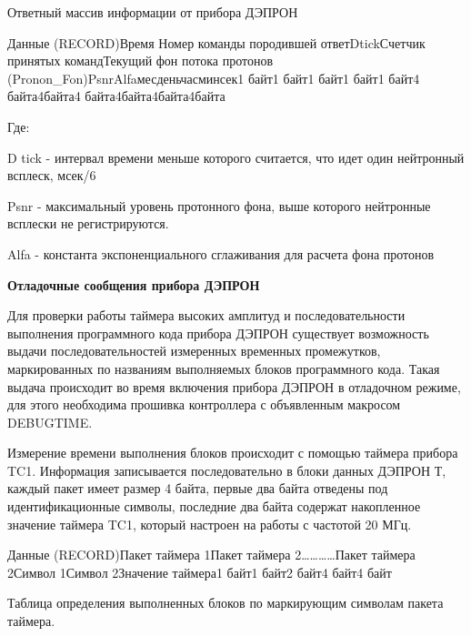 \documentclass[a4paper,portrait,12pt]{article}
\begin{document}
{{{{Ответный массив информации от прибора ДЭПРОН


{\small Данные (RECORD)Время Номер команды породившей ответD}{\small  }{\small tickСчетчик принятых командТекущий фон потока протонов (}{\small Pronon}{\small \_}{\small Fon}{\small )PsnrAlfaмесденьчасминсек1 байт1 байт1 байт1 байт1 байт4 байта}{\small 4}{\small  байта4 байта}{\small 4}{\small  байта}{\small 4}{\small  байта}{\small 4}{\small  байта}


\begin{flushleft}
Где:
\end{flushleft}


\begin{flushleft}
	D tick - интервал времени меньше которого считается, что идет один нейтронный всплеск, мсек/6
\end{flushleft}


	Psnr - максимальный уровень протонного фона, выше которого нейтронные всплески не регистрируются.


	Alfa - константа экспоненциального сглаживания для расчета фона протонов





\begin{center}
\textbf{Отладочные сообщения прибора ДЭПРОН}
\end{center}


Для проверки работы таймера высоких амплитуд и последовательности выполнения программного кода прибора ДЭПРОН существует возможность выдачи последовательностей измеренных временных промежутков, маркированных по названиям выполняемых блоков программного кода. Такая выдача происходит во время включения прибора ДЭПРОН в отладочном режиме, для этого необходима прошивка контроллера с объявленным макросом DEBUGTIME.


Измерение времени выполнения блоков происходит с помощью таймера прибора TC1. Информация записывается последовательно в блоки данных ДЭПРОН Т, каждый пакет имеет размер 4 байта, первые два байта отведены под идентификационные символы, последние два байта содержат накопленное значение таймера TC1, который настроен на работы с частотой 20 МГц.


{\small Данные (RECORD)Пакет таймера 1Пакет таймера 2\ldots{}\ldots{}\ldots{}\ldots{}Пакет таймера 2Символ 1Символ 2Значение таймера1 байт1 байт2 байт4 байт4 байт}





Таблица определения выполненных блоков по маркирующим символам пакета таймера.


}}}}
\end{document}
